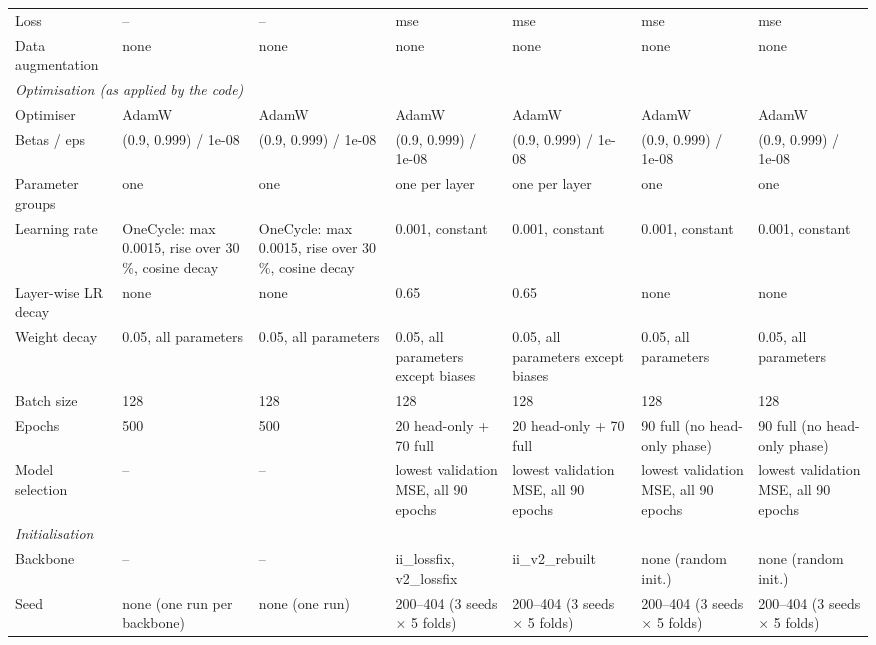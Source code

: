 \begin{table}[htbp]
\begin{tabular}{p{3.0cm}p{2.3cm}p{1.6cm}p{1.9cm}p{1.9cm}p{1.9cm}p{1.9cm}}
Loss & -- & -- & mse & mse & mse & mse \\
Data augmentation & none & none & none & none & none & none \\
\midrule
\multicolumn{7}{l}{\textit{Optimisation (as applied by the code)}} \\
Optimiser & AdamW & AdamW & AdamW & AdamW & AdamW & AdamW \\
Betas / eps & (0.9, 0.999) / 1e-08 & (0.9, 0.999) / 1e-08 & (0.9, 0.999) / 1e-08 & (0.9, 0.999) / 1e-08 & (0.9, 0.999) / 1e-08 & (0.9, 0.999) / 1e-08 \\
Parameter groups & one & one & one per layer & one per layer & one & one \\
Learning rate & OneCycle: max 0.0015, rise over 30\,\%, cosine decay & OneCycle: max 0.0015, rise over 30\,\%, cosine decay & 0.001, constant & 0.001, constant & 0.001, constant & 0.001, constant \\
Layer-wise LR decay & none & none & 0.65 & 0.65 & none & none \\
Weight decay & 0.05, all parameters & 0.05, all parameters & 0.05, all parameters except biases & 0.05, all parameters except biases & 0.05, all parameters & 0.05, all parameters \\
Batch size & 128 & 128 & 128 & 128 & 128 & 128 \\
Epochs & 500 & 500 & 20 head-only + 70 full & 20 head-only + 70 full & 90 full (no head-only phase) & 90 full (no head-only phase) \\
Model selection & -- & -- & lowest validation MSE, all 90 epochs & lowest validation MSE, all 90 epochs & lowest validation MSE, all 90 epochs & lowest validation MSE, all 90 epochs \\
\midrule
\multicolumn{7}{l}{\textit{Initialisation}} \\
Backbone & -- & -- & ii\_lossfix, v2\_lossfix & ii\_v2\_rebuilt & none (random init.) & none (random init.) \\
Seed & none (one run per backbone) & none (one run) & 200--404 (3 seeds $\times$ 5 folds) & 200--404 (3 seeds $\times$ 5 folds) & 200--404 (3 seeds $\times$ 5 folds) & 200--404 (3 seeds $\times$ 5 folds) \\
\bottomrule
\end{tabular}


\end{table}

